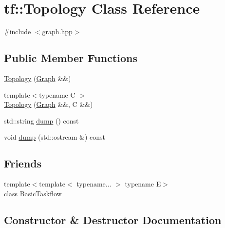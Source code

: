 \hypertarget{classtf_1_1Topology}{}\section{tf\+:\+:Topology Class Reference}
\label{classtf_1_1Topology}


{\ttfamily \#include $<$graph.\+hpp$>$}

\subsection*{Public Member Functions}
\begin{DoxyCompactItemize}
\item 
\hyperlink{classtf_1_1Topology_ab0f146309db799239e1e888fd1e13d02}{Topology} (\hyperlink{namespacetf_a2afa7da139285640eaf8122535136dc9}{Graph} \&\&)
\item 
{\footnotesize template$<$typename C $>$ }\\\hyperlink{classtf_1_1Topology_a303fa5fb107070ac5180841c0811cfae}{Topology} (\hyperlink{namespacetf_a2afa7da139285640eaf8122535136dc9}{Graph} \&\&, C \&\&)
\item 
std\+::string \hyperlink{classtf_1_1Topology_a83242ca6b464589d405b9450a418f8ff}{dump} () const
\item 
void \hyperlink{classtf_1_1Topology_a724a982f74804e5ea072845e9c7389a3}{dump} (std\+::ostream \&) const
\end{DoxyCompactItemize}
\subsection*{Friends}
\begin{DoxyCompactItemize}
\item 
{\footnotesize template$<$template$<$ typename... $>$ typename E$>$ }\\class \hyperlink{classtf_1_1Topology_ab3ad8c5c7ed22c3fbd8a41b84db75083}{Basic\+Taskflow}
\end{DoxyCompactItemize}


\subsection{Constructor \& Destructor Documentation}
\mbox{\label{classtf_1_1Topology_ab0f146309db799239e1e888fd1e13d02}} 
